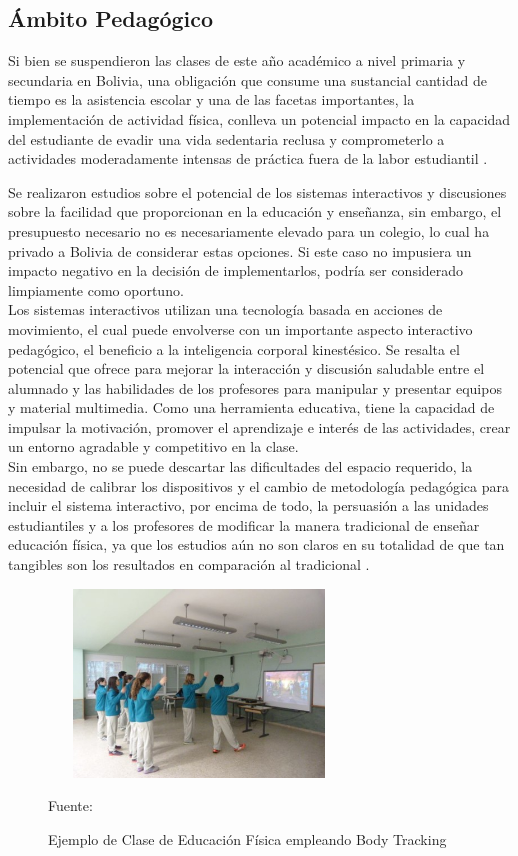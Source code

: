 \subsection{Ámbito Pedagógico}

Si bien se suspendieron las clases de este año académico a nivel primaria y secundaria en Bolivia, una obligación que consume una sustancial cantidad de tiempo es la asistencia escolar y una de las facetas importantes, la implementación de actividad física, conlleva un potencial impacto en la capacidad del estudiante de evadir una vida sedentaria reclusa y comprometerlo a actividades moderadamente intensas de práctica fuera de la labor estudiantil \cite{daly2018systematic}.

Se realizaron estudios sobre el potencial de los sistemas interactivos y discusiones sobre la facilidad que proporcionan en la educación y enseñanza, sin embargo, el presupuesto necesario no es necesariamente elevado para un colegio, lo cual ha privado a Bolivia de considerar estas opciones. Si este caso no impusiera un impacto negativo en la decisión de implementarlos, podría ser considerado limpiamente como oportuno.\\

Los sistemas interactivos utilizan una tecnología basada en acciones de movimiento, el cual puede envolverse con un importante aspecto interactivo pedagógico, el beneficio a la inteligencia corporal kinestésico. Se resalta el potencial que ofrece para mejorar la interacción y discusión saludable entre el alumnado y las habilidades de los profesores para manipular y presentar equipos y material multimedia. Como una herramienta educativa, tiene la capacidad de impulsar la motivación, promover el aprendizaje e interés de las actividades, crear un entorno agradable y competitivo en la clase\cite{pirie1995meaning}.\\

Sin embargo, no se puede descartar las dificultades del espacio requerido, la necesidad de calibrar los dispositivos y el cambio de metodología pedagógica para incluir el sistema interactivo, por encima de todo, la persuasión a las unidades estudiantiles y a los profesores de modificar la manera tradicional de enseñar educación física, ya que los estudios aún no son claros en su totalidad de que tan tangibles son los resultados en comparación al tradicional \cite{daly2018systematic}. \\
\begin{figure}[t!]
	\centering
	\includegraphics[width=8cm,height=5cm,]{./Images/kinectexampleschool.jpg}
	\caption{Ejemplo de Clase de Educación Física empleando Body Tracking}
	\footnotesize Fuente: \cite{kinectexampleschool}
	\label{claseEF}
\end{figure}

